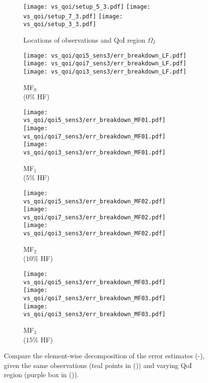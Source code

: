 \begin{figure}
\captionsetup[subfigure]{justification=centering}
\centering
  \begin{subfigure}[t]{0.191\textwidth}
  \centering
    \texttt{[image: vs\_qoi/setup\_5\_3.pdf]}
    \texttt{[image: vs\_qoi/setup\_7\_3.pdf]}
    \texttt{[image: vs\_qoi/setup\_3\_3.pdf]}
    \caption{Locations of observations and QoI region $\Omega_I$}
    \label{subfig:obsSetup}
  \end{subfigure}
  \begin{subfigure}[t]{0.155\textwidth}
  \centering
    \texttt{[image: vs\_qoi/qoi5\_sens3/err\_breakdown\_LF.pdf]}
    \texttt{[image: vs\_qoi/qoi7\_sens3/err\_breakdown\_LF.pdf]}
    \texttt{[image: vs\_qoi/qoi3\_sens3/err\_breakdown\_LF.pdf]}
    \caption{MF$_0$ \\ ($0\%$ HF)}
    \label{subfig:obsLF}
  \end{subfigure}
  \begin{subfigure}[t]{0.155\textwidth}
  \centering
    \texttt{[image: vs\_qoi/qoi5\_sens3/err\_breakdown\_MF01.pdf]}
    \texttt{[image: vs\_qoi/qoi7\_sens3/err\_breakdown\_MF01.pdf]}
    \texttt{[image: vs\_qoi/qoi3\_sens3/err\_breakdown\_MF01.pdf]}
    \caption{MF$_1$ \\ ($5\%$ HF)}
  \end{subfigure}
  \begin{subfigure}[t]{0.155\textwidth}
  \centering
    \texttt{[image: vs\_qoi/qoi5\_sens3/err\_breakdown\_MF02.pdf]}
    \texttt{[image: vs\_qoi/qoi7\_sens3/err\_breakdown\_MF02.pdf]}
    \texttt{[image: vs\_qoi/qoi3\_sens3/err\_breakdown\_MF02.pdf]}
    \caption{MF$_2$ \\ ($10\%$ HF)}
  \end{subfigure}
  \begin{subfigure}[t]{0.243\textwidth}
  \centering
    \texttt{[image: vs\_qoi/qoi5\_sens3/err\_breakdown\_MF03.pdf]}
    \texttt{[image: vs\_qoi/qoi7\_sens3/err\_breakdown\_MF03.pdf]}
    \texttt{[image: vs\_qoi/qoi3\_sens3/err\_breakdown\_MF03.pdf]}
    \caption{MF$_3$ \\ ($15\%$ HF)}
    \label{subfig:obsMFlast}
  \end{subfigure}
  \caption{Compare the element-wise decomposition of the error estimates (-), given the same observations (teal points in ()) and varying QoI region (purple box in ()).}
  \label{fig:qoiStudy}
\end{figure}


